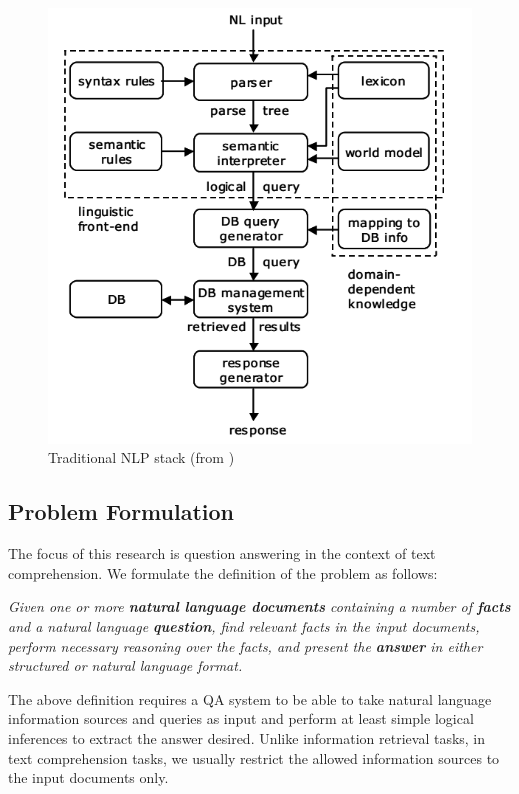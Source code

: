 \documentclass[]{article}
\begin{document}
\begin{center}
\begin{figure}
\includegraphics[width=\linewidth]{media/tradi.png}
\caption{Traditional NLP stack (from \cite{andrenucci2005automated})}
\label{fig:tradi}
\end{figure}
\end{center}

\subsection{Problem Formulation}
The focus of this research is question answering in the context of text comprehension. We formulate the definition of the problem as follows: 
\begin{center}
\textit{Given one or more \textbf{natural language documents} containing a number of \textbf{facts} and a natural language \textbf{question}, find relevant facts in the input documents, perform necessary reasoning over the facts, and present the \textbf{answer} in either structured or natural language format.}
\end{center}

The above definition requires a QA system to be able to take natural language information sources and queries as input and perform at least simple logical inferences to extract the answer desired. Unlike information retrieval tasks, in text comprehension tasks, we usually restrict the allowed information sources to the input documents only.
\end{document}
